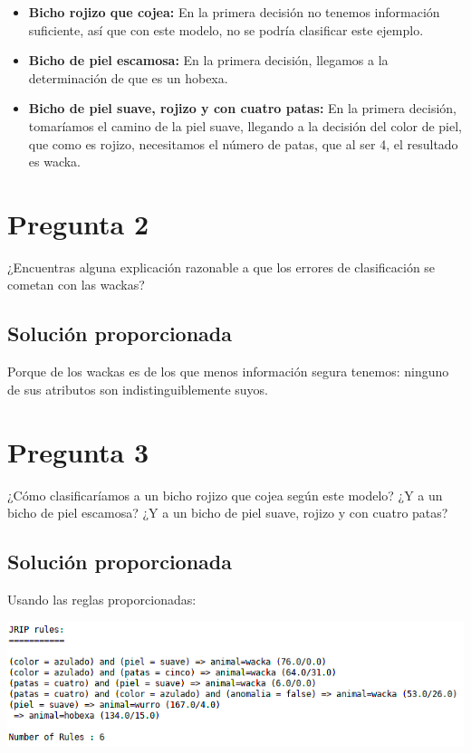 \documentclass{article}
\begin{document}
\begin{itemize}
\item \textbf{Bicho rojizo que cojea:} En la primera decisión no tenemos información suficiente, así que con este modelo, no se podría clasificar este ejemplo.
\item \textbf{Bicho de piel escamosa:} En la primera decisión, llegamos a la determinación de que es un hobexa.
\item \textbf{Bicho de piel suave, rojizo y con cuatro patas:} En la primera decisión, tomaríamos el camino de la piel suave, llegando a la decisión del color de piel, que como es rojizo, necesitamos el número de patas, que al ser 4, el resultado es wacka.
\end{itemize}

\section{Pregunta 2}

¿Encuentras alguna explicación razonable a que los errores de clasificación se cometan con las wackas?

\subsection{Solución proporcionada}

Porque de los wackas es de los que menos información segura tenemos: ninguno de sus atributos son indistinguiblemente suyos.

\section{Pregunta 3}

¿Cómo clasificaríamos a un bicho rojizo que cojea según este modelo? ¿Y a un bicho de piel escamosa? ¿Y a un bicho de piel suave, rojizo y con cuatro patas?

\subsection{Solución proporcionada}

Usando las reglas proporcionadas:

\begin{center}
\includegraphics[scale=0.5]{images/rules.png}
\end{center}
\end{document}
